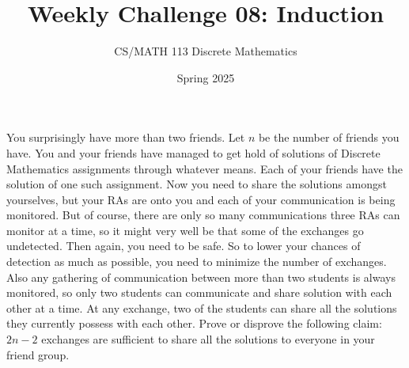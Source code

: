 \documentclass[a4paper]{exam}
\title{Weekly Challenge 08: Induction}
\author{CS/MATH 113 Discrete Mathematics}
\date{Spring 2025}
\begin{document}
\maketitle



\begin{questions}
     You surprisingly have more than two friends. Let $n$ be the number of friends you have. You and your friends have managed to get hold of solutions of Discrete Mathematics assignments through whatever means. Each of your friends have the solution of one such assignment. Now you need to share the solutions amongst yourselves, but your RAs are onto you and each of your communication is being monitored. But of course, there are only so many communications three RAs can monitor at a time, so it might very well be that some of the exchanges go undetected. Then again, you need to be safe. So to lower your chances of detection as much as possible, you need to minimize the number of exchanges. Also any gathering of communication between more than two students is always monitored, so only two students can communicate and share solution with each other at a time. At any exchange, two of the students can share all the solutions they currently possess with each other. Prove or disprove the following claim: $2n-2$ exchanges are sufficient to share all the solutions to everyone in your friend group.



    \begin{figure}[!tbh]
        \centering
\end{figure}
\end{questions}
\end{document}
